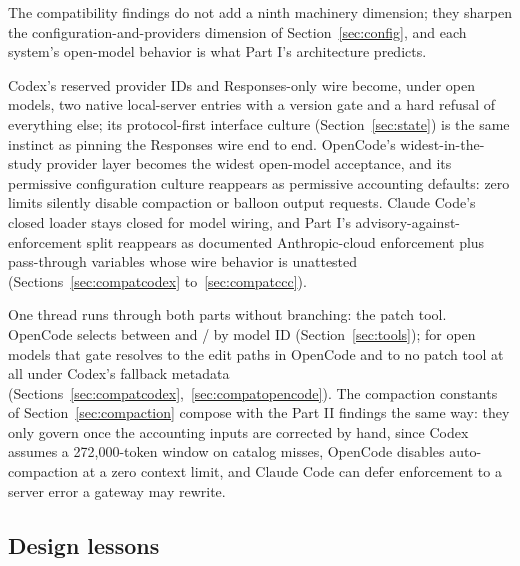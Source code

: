 \documentclass{article}
\newcommand{\codex}[0]{Codex}
\newcommand{\occ}[0]{OpenCode}
\newcommand{\ccc}[0]{Claude Code}
\begin{document}
The compatibility findings do not add a ninth machinery dimension; they
sharpen the configuration-and-providers dimension of
Section~\ref{sec:config}, and each system's open-model behavior is what
Part I's architecture predicts.

\codex{}'s reserved provider IDs and Responses-only wire become, under
open models, two native local-server entries with a version gate and a
hard refusal of everything else; its protocol-first interface culture
(Section~\ref{sec:state}) is the same instinct as pinning the Responses
wire end to end. \occ{}'s widest-in-the-study provider layer becomes the
widest open-model acceptance, and its permissive configuration culture
reappears as permissive accounting defaults: zero limits silently disable
compaction or balloon output requests. \ccc{}'s closed loader stays
closed for model wiring, and Part I's advisory-against-enforcement split
reappears as documented Anthropic-cloud enforcement plus pass-through
variables whose wire behavior is unattested
(Sections~\ref{sec:compatcodex} to~\ref{sec:compatccc}).

One thread runs through both parts without branching: the patch tool.
\occ{} selects between  and / by
model ID (Section~\ref{sec:tools}); for open models that gate resolves to
the edit paths in \occ{} and to no patch tool at all under \codex{}'s
fallback metadata (Sections~\ref{sec:compatcodex},~\ref{sec:compatopencode}).
The compaction constants of Section~\ref{sec:compaction} compose with the
Part II findings the same way: they only govern once the accounting
inputs are corrected by hand, since \codex{} assumes a 272{,}000-token
window on catalog misses, \occ{} disables auto-compaction at a zero
context limit, and \ccc{} can defer enforcement to a server error a
gateway may rewrite.

\subsection{Design lessons}
\label{sec:lessons}
\end{document}
